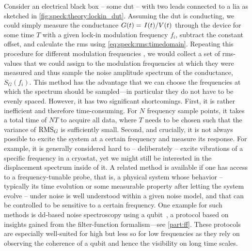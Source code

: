 Consider an electrical black box -- some \acrfull{dut} -- with two leads connected to a \acrfull{lia} as sketched in \cref{fig:speck:theory:lockin_dut}.
Assuming the \gls{dut} is conducting, we could simply measure the conductance $G(t) = \flatfrac{I(t)}{V(t)}$ through the device for some time $T$ with a given lock-in modulation frequency $f_i$, subtract the constant offset,
and calculate the \gls{rms} using \cref{eq:speck:rms:timedomain}.
Repeating this procedure for different modulation frequencies , we would collect a set of \gls{rms}-values that we could assign to the modulation frequencies at which they were measured and thus sample the noise amplitude spectrum
of the conductance, $S_G(f_i)$.
This method has the advantage that we can choose the frequencies at which the spectrum should be sampled---in particular they do not have to be evenly spaced.
However, it has two significant shortcomings.
First, it is rather inefficient and therefore time-consuming.
For $N$ frequency sample points, it takes a total time of $NT$ to acquire all data, where $T$ needs to be chosen such that the variance of $\operatorname{RMS}_G$ is sufficiently small.
Second, and crucially, it is not always possible to excite the system at a certain frequency and measure its response.
For example, it is generally considered hard
to -- deliberately -- excite vibrations of a specific frequency in a cryostat, yet we might still be interested in the displacement spectrum inside of it.
A related method is available if one has access to a frequency-tunable probe, that is, a physical system whose behavior -- typically its time evolution or some measurable property after letting the system evolve -- under noise is well understood within a given noise model, and that can be controlled to be sensitive to a certain frequency.
One example for such methods is \gls{dd}-based noise spectroscopy using a qubit~\cite{Alvarez2011,Szankowski2017,Dial2013,Connors2022}, a protocol based on insights gained from the filter-function formalism---see \cref{part:ff}.
These protocols are especially well-suited for high but less so for low frequencies as they rely on observing the coherence of a qubit and hence the visibility on long time scales.

